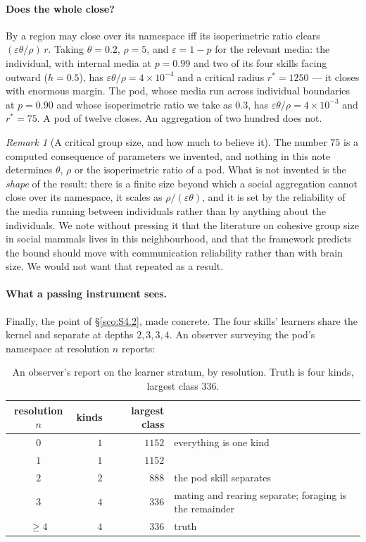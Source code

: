 \documentclass[11pt]{article}
\theoremstyle{plain}
\theoremstyle{definition}
\theoremstyle{remark}
\newtheorem{remark}[theorem]{Remark}
\begin{document}
\paragraph{Does the whole close?}
By \cite[\S7]{engine} a region may close over its namespace iff its
isoperimetric ratio clears $(\varepsilon\theta/\rho)\,r$. Taking
$\theta = 0.2$, $\rho = 5$, and $\varepsilon = 1-p$ for the relevant
media: the individual, with internal media at $p=0.99$ and two of its four
skills facing outward ($h = 0.5$), has
$\varepsilon\theta/\rho = 4\times 10^{-4}$ and a critical radius
$r^\ast = 1250$ --- it closes with enormous margin. The pod, whose media
run across individual boundaries at $p = 0.90$ and whose isoperimetric
ratio we take as $0.3$, has $\varepsilon\theta/\rho = 4\times 10^{-3}$ and
$r^\ast = 75$. A pod of twelve closes. An aggregation of two hundred does
not.

\begin{remark}[A critical group size, and how much to believe it]
\label{sco:rem:groupsize}
The number $75$ is a computed consequence of parameters we invented, and
nothing in this note determines $\theta$, $\rho$ or the isoperimetric
ratio of a pod. What is not invented is the \emph{shape} of the result:
there is a finite size beyond which a social aggregation cannot close over
its namespace, it scales as $\rho/(\varepsilon\theta)$, and it is set by
the reliability of the media running between individuals rather than by
anything about the individuals. We note without pressing it that the
literature on cohesive group size in social mammals lives in this
neighbourhood, and that the framework predicts the bound should move with
communication reliability rather than with brain size. We would not want
that repeated as a result.
\end{remark}

\paragraph{What a passing instrument sees.}
Finally, the point of \S\ref{sco:S4.2}, made concrete. The four skills'
learners share the kernel and separate at depths $2,3,3,4$. An observer
surveying the pod's namespace at resolution $n$ reports:

\begin{table}[h]
\centering
\small
\begin{tabular}{crrl}
\toprule
resolution $n$ & kinds & largest class & \\
\midrule
$0$ & $1$ & $1152$ & everything is one kind \\
$1$ & $1$ & $1152$ & \\
$2$ & $2$ & $888$ & the pod skill separates \\
$3$ & $4$ & $336$ & mating and rearing separate; foraging is the remainder \\
$\ge 4$ & $4$ & $336$ & truth \\
\bottomrule
\end{tabular}
\caption{An observer's report on the learner stratum, by resolution. Truth
is four kinds, largest class $336$.}
\label{sco:tab:observer}
\end{table}
\end{document}
